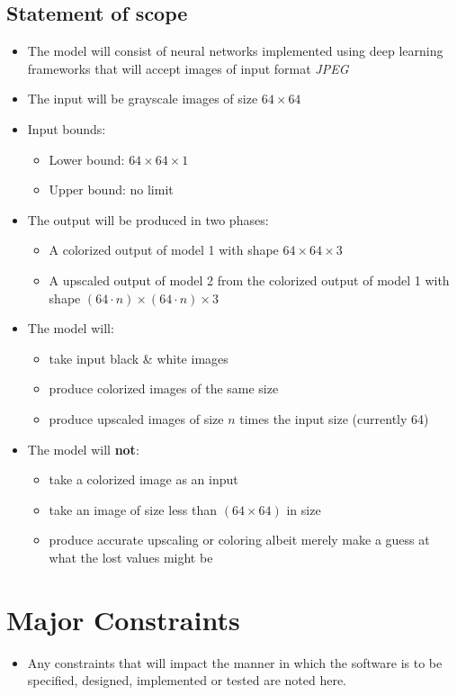 \documentclass[oneside,a4paper,12pt]{report}
\begin{document}
 \subsection{Statement of scope}
	\begin{itemize}
	\item The model will consist of neural networks implemented using deep learning frameworks that will accept images of input format \textit{JPEG}
	\item The input will be grayscale images of size $64\times 64$



	\item Input bounds:
	\begin{itemize}
		\item Lower bound: $64\times 64\times 1$
		\item Upper bound: no limit
	\end{itemize}
	\item The output will be produced in two phases:
	\begin{itemize}
		\item A colorized output of model 1 with shape $64\times 64\times 3$
		\item A upscaled output of model 2 from the colorized output of model 1 with shape $(64\cdot n)\times (64\cdot n)\times 3$
	\end{itemize}
	\item The model will:
	\begin{itemize}
		\item take input black \& white images
		\item produce colorized images of the same size
		\item produce upscaled images of size $n$ times the input size (currently 64)
	\end{itemize}
	\item The model will \textbf{not}:
	\begin{itemize}
		\item take a colorized image as an input
		\item take an image of size less than $(64 \times 64)$ in size
		\item produce accurate upscaling or coloring albeit merely make a guess at what the lost values might be
	\end{itemize}
	\end{itemize}

\section{Major Constraints}
\begin{itemize}
\item Any constraints that will impact the manner in which the software is to be specified, designed, implemented or tested are noted here.
\end{itemize}
\end{document}
